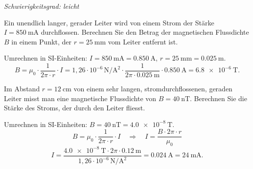 \documentclass[addpoints,11pt,a4paper]{exam}
\newlength{\antwortraumlen}
\newcommand{\Antwortraum}[1]{%
  \pgfmathsetlength{\antwortraumlen}{#1*2.5cm}%
  \begin{answerbox}
    \rule{0pt}{\antwortraumlen}%
  \end{answerbox}%
}
\newcommand{\Schwierigkeit}[1]{%
  \textit{\color{darkgray}Schwierigkeitsgrad: #1}\par\smallskip
}
\begin{document}
\begin{questions}
\begin{taskbox}
\Schwierigkeit{leicht}
\question[2] Ein unendlich langer, gerader Leiter wird von einem Strom der
Stärke $I=\SI{850}{\milli\ampere}$ durchflossen. Berechnen Sie den Betrag
der magnetischen Flussdichte $B$ in einem Punkt, der $r=\SI{25}{\milli\meter}$
vom Leiter entfernt ist.
\Antwortraum{2}
\begin{solution}
Umrechnen in SI-Einheiten: $I=\SI{850}{\milli\ampere}=\SI{0.850}{\ampere}$,
$r=\SI{25}{\milli\meter}=\SI{0.025}{\meter}$.
\[
  B = \mu_0\cdot\frac{1}{2\pi\cdot r}\cdot I
    = 1{,}26\cdot10^{-6}\,\si{\newton\per\ampere\squared}\cdot\frac{1}{2\pi\cdot\SI{0.025}{\meter}}\cdot\SI{0.850}{\ampere}
    = \SI{6.8e-6}{\tesla}.
\]
\end{solution}

\question[3] Im Abstand $r=\SI{12}{\centi\meter}$ von einem sehr langen,
stromdurchflossenen, geraden Leiter misst man eine magnetische Flussdichte
von $B=\SI{40}{\nano\tesla}$. Berechnen Sie die Stärke des Stroms, der
durch den Leiter fliesst.
\Antwortraum{3}
\begin{solution}
Umrechnen in SI-Einheiten: $B=\SI{40}{\nano\tesla}=\SI{4.0e-8}{\tesla}$.
\[
  B = \mu_0\cdot\frac{1}{2\pi\cdot r}\cdot I
  \quad\Longrightarrow\quad
  I = \frac{B\cdot 2\pi\cdot r}{\mu_0}
\]
\[
  I = \frac{\SI{4.0e-8}{\tesla}\cdot 2\pi\cdot\SI{0.12}{\meter}}{1{,}26\cdot10^{-6}\,\si{\newton\per\ampere\squared}}
    = \SI{0.024}{\ampere} = \SI{24}{\milli\ampere}.
\]
\end{solution}
\end{taskbox}
\end{questions}
\end{document}
